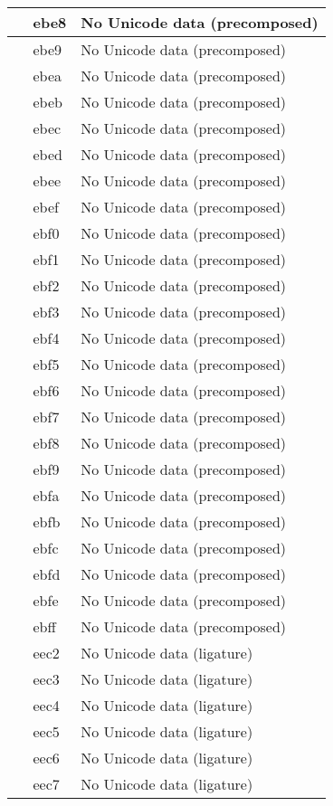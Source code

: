 \documentclass[12pt,letterpaper,openany]{book}
\begin{document}
\begin{center}
\begin{supertabular}{|m{0.25in}|m{0.5in}|m{4in}|}
 & ebe8 & No Unicode data (precomposed)\\\hline
 & ebe9 & No Unicode data (precomposed)\\\hline
 & ebea & No Unicode data (precomposed)\\\hline
 & ebeb & No Unicode data (precomposed)\\\hline
 & ebec & No Unicode data (precomposed)\\\hline
 & ebed & No Unicode data (precomposed)\\\hline
 & ebee & No Unicode data (precomposed)\\\hline
 & ebef & No Unicode data (precomposed)\\\hline
 & ebf0 & No Unicode data (precomposed)\\\hline
 & ebf1 & No Unicode data (precomposed)\\\hline
 & ebf2 & No Unicode data (precomposed)\\\hline
 & ebf3 & No Unicode data (precomposed)\\\hline
 & ebf4 & No Unicode data (precomposed)\\\hline
 & ebf5 & No Unicode data (precomposed)\\\hline
 & ebf6 & No Unicode data (precomposed)\\\hline
 & ebf7 & No Unicode data (precomposed)\\\hline
 & ebf8 & No Unicode data (precomposed)\\\hline
 & ebf9 & No Unicode data (precomposed)\\\hline
 & ebfa & No Unicode data (precomposed)\\\hline
 & ebfb & No Unicode data (precomposed)\\\hline
 & ebfc & No Unicode data (precomposed)\\\hline
 & ebfd & No Unicode data (precomposed)\\\hline
 & ebfe & No Unicode data (precomposed)\\\hline
 & ebff & No Unicode data (precomposed)\\\hline
 & eec2 & No Unicode data (ligature)\\\hline
 & eec3 & No Unicode data (ligature)\\\hline
 & eec4 & No Unicode data (ligature)\\\hline
 & eec5 & No Unicode data (ligature)\\\hline
 & eec6 & No Unicode data (ligature)\\\hline
 & eec7 & No Unicode data (ligature)\\\hline

\end{supertabular}
\end{center}
\end{document}
